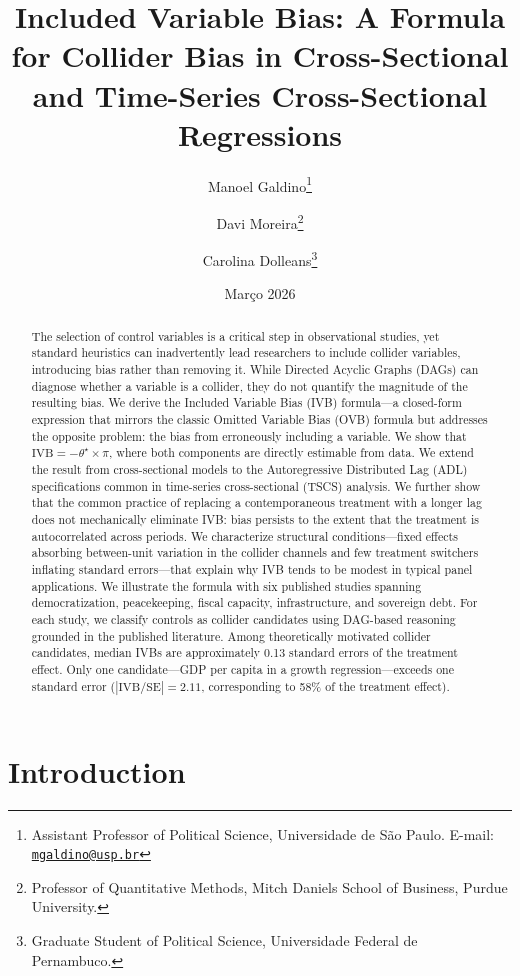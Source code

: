 \documentclass[
]{article}
\title{Included Variable Bias: A Formula for Collider Bias in
Cross-Sectional and Time-Series Cross-Sectional Regressions}
\author{Manoel Galdino\footnote{Assistant Professor of Political
  Science, Universidade de São Paulo. E-mail:
  \href{mailto:mgaldino@usp.br}{\nolinkurl{mgaldino@usp.br}}} \and Davi
Moreira\footnote{Professor of Quantitative Methods, Mitch Daniels School
  of Business, Purdue University.} \and Carolina Dolleans\footnote{Graduate
  Student of Political Science, Universidade Federal de Pernambuco.}}
\date{Março 2026}
\begin{document}
\maketitle
\begin{abstract}
The selection of control variables is a critical step in observational
studies, yet standard heuristics can inadvertently lead researchers to
include collider variables, introducing bias rather than removing it.
While Directed Acyclic Graphs (DAGs) can diagnose whether a variable is
a collider, they do not quantify the magnitude of the resulting bias. We
derive the Included Variable Bias (IVB) formula---a closed-form
expression that mirrors the classic Omitted Variable Bias (OVB) formula
but addresses the opposite problem: the bias from erroneously including
a variable. We show that \(\text{IVB} = -\theta^{\star} \times \pi\),
where both components are directly estimable from data. We extend the
result from cross-sectional models to the Autoregressive Distributed Lag
(ADL) specifications common in time-series cross-sectional (TSCS)
analysis. We further show that the common practice of replacing a
contemporaneous treatment with a longer lag does not mechanically
eliminate IVB: bias persists to the extent that the treatment is
autocorrelated across periods. We characterize structural
conditions---fixed effects absorbing between-unit variation in the
collider channels and few treatment switchers inflating standard
errors---that explain why IVB tends to be modest in typical panel
applications. We illustrate the formula with six published studies
spanning democratization, peacekeeping, fiscal capacity, infrastructure,
and sovereign debt. For each study, we classify controls as collider
candidates using DAG-based reasoning grounded in the published
literature. Among theoretically motivated collider candidates, median
IVBs are approximately 0.13 standard errors of the treatment effect.
Only one candidate---GDP per capita in a growth regression---exceeds one
standard error (\(|\text{IVB}/\text{SE}| = 2.11\), corresponding to 58\%
of the treatment effect).
\end{abstract}

\section{Introduction}\label{introduction}
\end{document}
